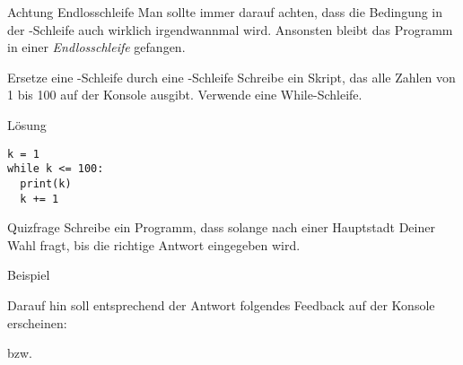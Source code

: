 \begin{frame}
\begin{alertblock}{Achtung Endlosschleife}
	\vspace{2pt}
	Man sollte immer darauf achten, dass die Bedingung in der -Schleife auch wirklich irgendwannmal  wird. Ansonsten bleibt das Programm in einer \emph{Endlosschleife} gefangen. 
\end{alertblock}
\end{frame}

\begin{fragile}[Übung]

\begin{block}{Ersetze eine -Schleife durch eine -Schleife}
\vspace{2pt}
Schreibe ein Skript, das alle Zahlen von 1 bis 100 auf der Konsole ausgibt. Verwende eine While-Schleife.
\vspace{12pt}
\begin{solutionblock}{Lösung}
\begin{verbatim}
k = 1
while k <= 100:
  print(k)
  k += 1
\end{verbatim}
\end{solutionblock}
\end{block}
\end{fragile}


\begin{fragile}[Übung]
\begin{block}{Quizfrage}
\vspace{2pt}
Schreibe ein Programm, dass solange nach einer Hauptstadt Deiner Wahl fragt, bis die richtige Antwort eingegeben wird. 
\end{block}

\pause 
\vspace{12pt}

\begin{exampleblock}{Beispiel}
\vspace{2pt}



Darauf hin soll entsprechend der Antwort folgendes Feedback auf der Konsole erscheinen: 


bzw. 

\end{exampleblock}
	
\end{fragile}


